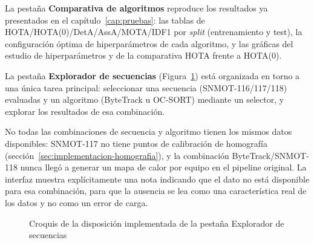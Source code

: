 La pestaña \textbf{Comparativa de algoritmos} reproduce los resultados ya presentados en el
capítulo~\ref{cap:pruebas}: las tablas de HOTA/HOTA(0)/DetA/AssA/MOTA/IDF1
por \emph{split} (entrenamiento y test), la configuración óptima de
hiperparámetros de cada algoritmo, y las gráficas del estudio de
hiperparámetros y de la comparativa HOTA frente a HOTA(0).

La pestaña \textbf{Explorador de secuencias} (Figura~\ref{fig:diseno-web-wireframe})
está organizada en torno a una única tarea principal: seleccionar una
secuencia (SNMOT-116/117/118) evaluadas y un algoritmo (ByteTrack u OC-SORT)
mediante un selector, y explorar los resultados de esa
combinación.

No todas las combinaciones de secuencia y algoritmo tienen los mismos
datos disponibles: SNMOT-117 no tiene puntos de calibración de homografía
(sección~\ref{sec:implementacion-homografia}), y la combinación
ByteTrack/SNMOT-118 nunca llegó a generar un mapa de calor por equipo en
el pipeline original. La interfaz
muestra explícitamente una nota indicando que el dato no está disponible
para esa combinación, para que la ausencia se lea como una característica
real de los datos y no como un error de carga.

\begin{figure}[htp]
\centering
{}
\caption{Croquis de la disposición implementada de la pestaña Explorador de secuencias}
\label{fig:diseno-web-wireframe}
\end{figure}
